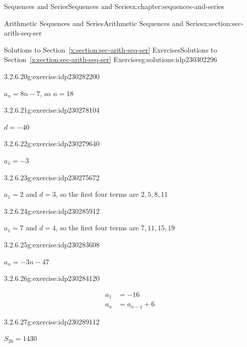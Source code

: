 \documentclass[twoside,10pt,]{book}
\newcommand{\xreffont}{\relax}
\numberwithin{equation}{section}
\newcommand{\amp}{&}
\begin{document}
\begin{chapterptx}{Sequences and Series}{}{Sequences and Series}{}{}{x:chapter:sequences-and-series}
\begin{sectionptx}{Arithmetic Sequences and Series}{}{Arithmetic Sequences and Series}{}{}{x:section:sec-arith-seq-ser}
\begin{solutions-subsection}{Solutions to Section~{\xreffont\ref*{x:section:sec-arith-seq-ser}} Exercises}{}{Solutions to Section~{\xreffont\ref*{x:section:sec-arith-seq-ser}} Exercises}{}{}{g:solutions:idp230302296}
\begin{divisionsolution}{3.2.6.20}{}{g:exercise:idp230282200}%
\par\smallskip%
\noindent\hypertarget{g:solution:idp230276696-main}{}\(a_n = 8n - 7\), so \(n = 18\)\end{divisionsolution}%
\begin{divisionsolution}{3.2.6.21}{}{g:exercise:idp230278104}%
\par\smallskip%
\noindent\hypertarget{g:solution:idp230279512-main}{}\(d=-40\)\end{divisionsolution}%
\begin{divisionsolution}{3.2.6.22}{}{g:exercise:idp230279640}%
\par\smallskip%
\noindent\hypertarget{g:solution:idp230279384-main}{}\(a_1=-3\)\end{divisionsolution}%
\begin{divisionsolution}{3.2.6.23}{}{g:exercise:idp230275672}%
\par\smallskip%
\noindent\hypertarget{g:solution:idp230280280-main}{}\(a_1=2\) and \(d=3\), so the first four terms are \(2, 5, 8, 11\)\end{divisionsolution}%
\begin{divisionsolution}{3.2.6.24}{}{g:exercise:idp230285912}%
\par\smallskip%
\noindent\hypertarget{g:solution:idp230287064-main}{}\(a_1=7\) and \(d=4\), so the first four terms are \(7, 11, 15, 19\)\end{divisionsolution}%
\begin{divisionsolution}{3.2.6.25}{}{g:exercise:idp230283608}%
\par\smallskip%
\noindent\hypertarget{g:solution:idp230286296-main}{}\(a_n =  - 3n - 47\)\end{divisionsolution}%
\begin{divisionsolution}{3.2.6.26}{}{g:exercise:idp230284120}%
\par\smallskip%
\noindent\hypertarget{g:solution:idp230288728-main}{}%
\begin{align*}
a_1\amp = -16\\
a_n\amp = a_{n-1}+6
\end{align*}
\end{divisionsolution}%
\begin{divisionsolution}{3.2.6.27}{}{g:exercise:idp230289112}%
\par\smallskip%
\noindent\hypertarget{g:solution:idp230289752-main}{}\(S_{20} = 1430\)\end{divisionsolution}%

\end{solutions-subsection}
\end{sectionptx}
\end{chapterptx}
\end{document}
